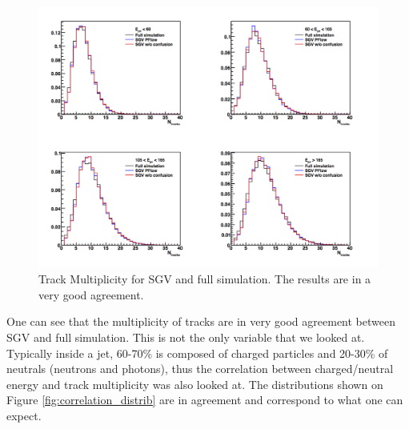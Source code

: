 \begin{figure}[t]
  \centering
  \includegraphics[scale=0.5]{chap6/fig_SGV/multiplicity_jet_track.png}
  \caption{Track Multiplicity for SGV and full simulation. The results are in a very good agreement.}
  \label{fig:trk_multiplicity}
\end{figure}

One can see that the multiplicity of tracks are in very good agreement between SGV and full simulation. This is not the only variable that we looked at. Typically inside a jet, 60-70\% is composed of charged particles and 20-30\% of neutrals (neutrons and photons), thus the correlation between charged/neutral energy and track multiplicity was also looked at. The distributions shown on Figure \ref{fig:correlation_distrib} are in agreement and correspond to what one can expect.


